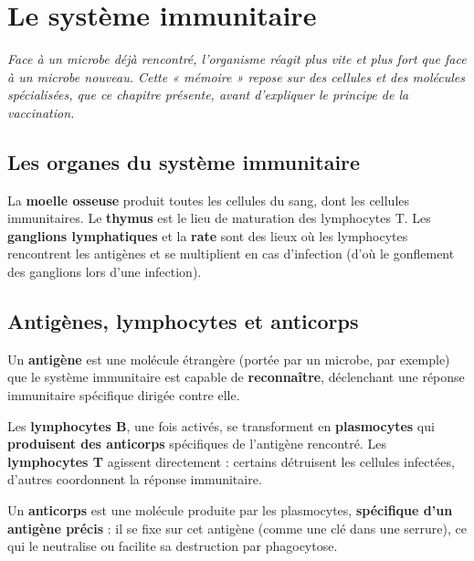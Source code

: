 \chapter{Le système immunitaire}

\noindent\textit{Face à un microbe déjà rencontré, l'organisme réagit plus vite et plus
fort que face à un microbe nouveau. Cette « mémoire » repose sur des cellules et des
molécules spécialisées, que ce chapitre présente, avant d'expliquer le principe de la
vaccination.}
\vspace{8pt}

\connecteBanner

\section{Les organes du système immunitaire}

\begin{propriete}
La \textbf{moelle osseuse} produit toutes les cellules du sang, dont les cellules
immunitaires. Le \textbf{thymus} est le lieu de maturation des lymphocytes T. Les
\textbf{ganglions lymphatiques} et la \textbf{rate} sont des lieux où les lymphocytes
rencontrent les antigènes et se multiplient en cas d'infection (d'où le gonflement des
ganglions lors d'une infection).
\end{propriete}

\section{Antigènes, lymphocytes et anticorps}

\begin{definition}[Antigène]
Un \textbf{antigène} est une molécule étrangère (portée par un microbe, par exemple) que
le système immunitaire est capable de \textbf{reconnaître}, déclenchant une réponse
immunitaire spécifique dirigée contre elle.
\end{definition}

\begin{propriete}
Les \textbf{lymphocytes B}, une fois activés, se transforment en \textbf{plasmocytes} qui
\textbf{produisent des anticorps} spécifiques de l'antigène rencontré. Les
\textbf{lymphocytes T} agissent directement : certains détruisent les cellules infectées,
d'autres coordonnent la réponse immunitaire.
\end{propriete}

\begin{definition}[Anticorps]
Un \textbf{anticorps} est une molécule produite par les plasmocytes, \textbf{spécifique
d'un antigène précis} : il se fixe sur cet antigène (comme une clé dans une serrure), ce
qui le neutralise ou facilite sa destruction par phagocytose.
\end{definition}

